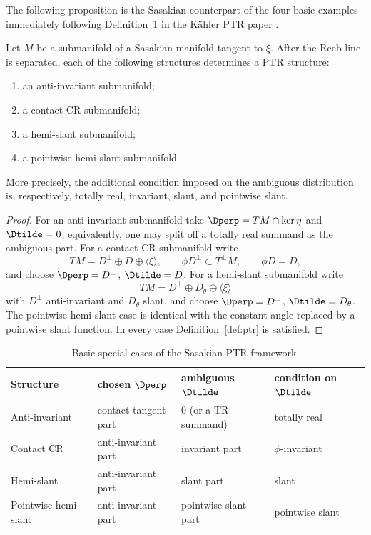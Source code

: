 \documentclass[11pt]{article}
\theoremstyle{definition}\newtheorem{definition}[theorem]{Definition}\newtheorem{example}[theorem]{Example}
\theoremstyle{remark}\newtheorem{remark}[theorem]{Remark}
\begin{document}
The following proposition is the Sasakian counterpart of the four basic
examples immediately following Definition~1 in the K\"ahler PTR paper
\cite{PoyrazSahinYerlikaya2025}.

\begin{proposition}\label{prop:inclusions}
Let \(M\) be a submanifold of a Sasakian manifold tangent to \(\xi\).
After the Reeb line is separated, each of the following structures
determines a PTR structure:
\begin{enumerate}
\item an anti-invariant submanifold;
\item a contact CR-submanifold;
\item a hemi-slant submanifold;
\item a pointwise hemi-slant submanifold.
\end{enumerate}
More precisely, the additional condition imposed on the ambiguous
distribution is, respectively, totally real, invariant, slant, and
pointwise slant.
\end{proposition}

\begin{proof}
For an anti-invariant submanifold take
\(\Dperp=TM\cap\ker\eta\) and \(\Dtilde=0\); equivalently, one may split
off a totally real summand as the ambiguous part.  For a contact
CR-submanifold write
\[
 TM=D^\perp\oplus D\oplus\langle\xi\rangle,
 \qquad \phi D^\perp\subset T^\perp M,\qquad \phi D=D,
\]
and choose \(\Dperp=D^\perp\), \(\Dtilde=D\).  For a hemi-slant
submanifold write
\[
 TM=D^\perp\oplus D_\theta\oplus\langle\xi\rangle
\]
with \(D^\perp\) anti-invariant and \(D_\theta\) slant, and choose
\(\Dperp=D^\perp\), \(\Dtilde=D_\theta\).  The pointwise hemi-slant case
is identical with the constant angle replaced by a pointwise slant
function.  In every case Definition~\ref{def:ptr} is satisfied.
\end{proof}

\begin{table}[ht]
\centering
\small
\caption{Basic special cases of the Sasakian PTR framework.}
\label{tab:ptr-inclusions}
\begin{tabular}{@{}llll@{}}
\toprule
Structure & chosen \(\Dperp\) & ambiguous \(\Dtilde\) & condition on \(\Dtilde\)\\
\midrule
Anti-invariant & contact tangent part & \(0\) (or a TR summand) & totally real\\
Contact CR & anti-invariant part & invariant part & \(\phi\)-invariant\\
Hemi-slant & anti-invariant part & slant part & slant\\
Pointwise hemi-slant & anti-invariant part & pointwise slant part & pointwise slant\\
\bottomrule
\end{tabular}
\end{table}
\end{document}

